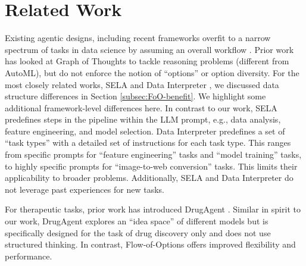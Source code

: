 \section{Related Work}
Existing agentic designs, including recent frameworks overfit to a narrow spectrum of tasks in data science by assuming an overall workflow \citep{guo2024ds,wu2023autogen,baek2024researchagent,grosnit2024large}. Prior work has looked at Graph of Thoughts \citep{besta2024graph} to tackle reasoning problems (different from AutoML), but do not enforce the notion of ``options'' or option diversity. For the most closely related works, SELA \citep{chi2024sela} and Data Interpreter \citep{hong2024data}, we discussed data structure differences in Section \ref{subsec:FoO-benefit}. We highlight some additional framework-level differences here. 
In contrast to our work, SELA \citep{chi2024sela} predefines steps in the pipeline within the LLM prompt, e.g., data analysis, feature engineering, and model selection. Data Interpreter predefines a set of ``task types'' with a detailed set of instructions for each task type. This ranges from specific prompts for ``feature engineering'' tasks and ``model training'' tasks, to highly specific prompts for ``image-to-web conversion'' tasks. This limits their applicability to broader problems. Additionally, SELA and Data Interpreter do not leverage past experiences for new tasks. 

For therapeutic tasks, prior work has introduced DrugAgent \citep{liu2024drugagent}. Similar in spirit to our work, DrugAgent explores an ``idea space'' of different models but is specifically designed for the task of drug discovery only and does not use structured thinking. In contrast, Flow-of-Options offers improved flexibility and performance.